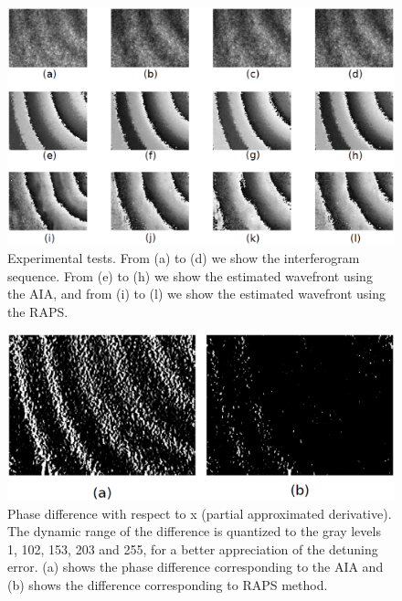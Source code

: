 \begin{figure}[th!]
	\begin{center}
		\includegraphics[scale=0.3]{Chpt3_figures/fig_3.eps}
	\end{center}
	\caption{Experimental tests. From (a) to (d) we show the interferogram
	sequence. From (e) to (h) we show the estimated wavefront using the AIA,
	and from (i) to (l) we show the estimated wavefront using the RAPS.} 
	\label{fig:ExperimentalTestRAPS}
\end{figure}

\begin{figure}[th!]
	\begin{center}
		\includegraphics[scale=0.3]{Chpt3_figures/fig_4.eps}
	\end{center}
	\caption{Phase difference with respect to x (partial approximated
	derivative). The dynamic range of the difference is quantized to the
	gray levels 1, 102, 153, 203 and 255, for a better appreciation of the
	detuning error. (a) shows the phase difference corresponding to the AIA
	and (b) shows the difference corresponding to RAPS method.}
	\label{fig:DynamicRAPS}
\end{figure}

